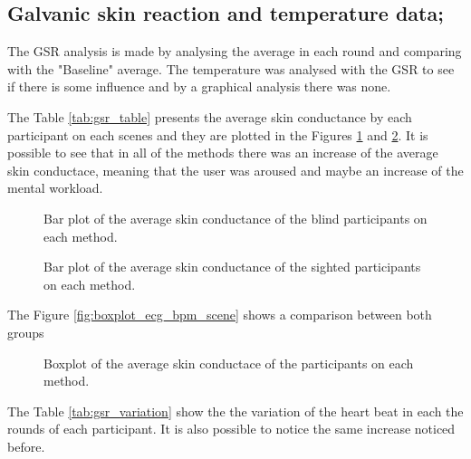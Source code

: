 
\subsection{Galvanic skin reaction and temperature data;}
\label{subsec:results_gsr_temp}

The GSR analysis is made by analysing the average in each round and comparing with the "Baseline" average. The temperature was analysed with the GSR to see if there is some influence and by a graphical analysis there was none.

The Table \ref{tab:gsr_table} presents the average skin conductance by each participant on each scenes and they are plotted in the Figures \ref{fig:barplot_gsr_scene_blind} and \ref{fig:barplot_gsr_scene_sight}. It is possible to see that in all of the methods there was an increase of the average skin conductace, meaning that the user was aroused and maybe an increase of the mental workload.



\begin{figure}[!htb]
    \centering
    \resizebox{0.6\linewidth}{!}{
    
    }
    \caption{Bar plot of the average skin conductance of the blind participants on each method.}
    \label{fig:barplot_gsr_scene_blind}
\end{figure}

\begin{figure}[!htb]
    \centering
    \resizebox{0.6\linewidth}{!}{
        
    }
    \caption{Bar plot of the average skin conductance of the sighted participants on each method.}
    \label{fig:barplot_gsr_scene_sight}
\end{figure}

The Figure \ref{fig:boxplot_ecg_bpm_scene} shows a comparison between both groups

\begin{figure}[!htb]
    \centering
    \resizebox{0.6\linewidth}{!}{
        
    }
    \caption{Boxplot of the average skin conductace of the participants on each method.}
    \label{fig:boxplot_gsr_scene}
\end{figure}

The Table \ref{tab:gsr_variation} show the the variation of the heart beat in each the rounds of each participant. It is also possible to notice the same increase noticed before.

